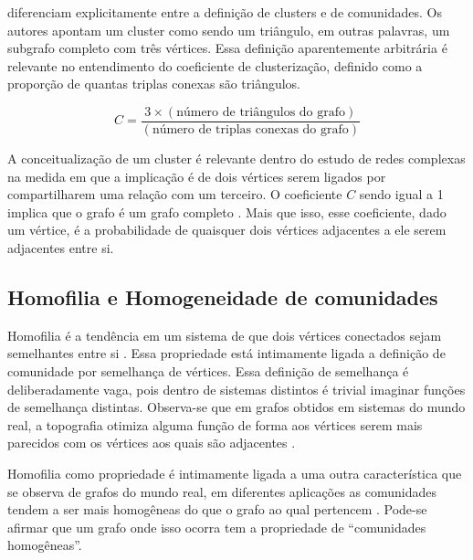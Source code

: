 \documentclass[notes.tex]{subfiles}
\begin{document}
 diferenciam explicitamente entre a definição de clusters e de comunidades.
Os autores apontam um cluster como sendo um triângulo, em outras palavras, um subgrafo completo com três vértices.
Essa definição aparentemente arbitrária é relevante no entendimento do coeficiente de clusterização, definido como a proporção de quantas triplas conexas são triângulos.


\begin{equation}\label{eq:coef_clus}
    C = \frac{3 \times (\text{número de triângulos do grafo})}{(\text{número de triplas conexas do grafo})}
\end{equation}


A conceitualização de um cluster é relevante dentro do estudo de redes complexas na medida em que a implicação é de dois vértices serem ligados por compartilharem uma relação com um terceiro.
O coeficiente $C$ sendo igual a 1 implica que o grafo é um grafo completo \cite{girvan2002community}.
Mais que isso, esse coeficiente, dado um vértice, é a probabilidade de quaisquer dois vértices adjacentes a ele serem adjacentes entre si.

\subsection{Homofilia e Homogeneidade de comunidades}

Homofilia é a tendência em um sistema de que dois vértices conectados sejam semelhantes entre si \cite{akoglu2009rtg}.
Essa propriedade está intimamente ligada a definição de comunidade por semelhança de vértices.
Essa definição de semelhança é deliberadamente vaga, pois dentro de sistemas distintos é trivial imaginar funções de semelhança distintas.
Observa-se que em grafos obtidos em sistemas do mundo real, a topografia otimiza alguma função de forma aos vértices serem mais parecidos com os vértices aos quais são adjacentes \cite{largeron2015generating}.

Homofilia como propriedade é intimamente ligada a uma outra característica que se observa de grafos do mundo real, em diferentes aplicações as comunidades tendem a ser mais homogêneas do que o grafo ao qual pertencem \cite{largeron2015generating}.
Pode-se afirmar que um grafo onde isso ocorra tem a propriedade de ``comunidades homogêneas''.
\end{document}
